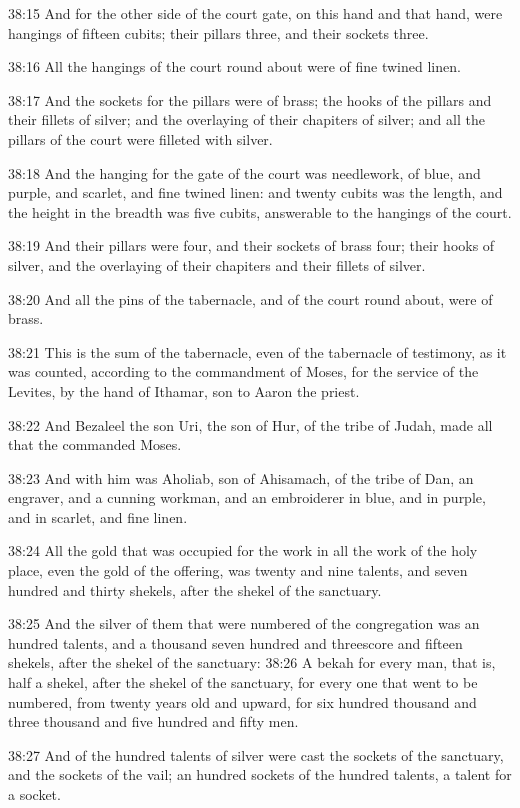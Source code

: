 38:15 And for the other side of the court gate, on this hand and that hand, were hangings of fifteen cubits; their pillars three, and their sockets three.

38:16 All the hangings of the court round about were of fine twined linen.

38:17 And the sockets for the pillars were of brass; the hooks of the pillars and their fillets of silver; and the overlaying of their chapiters of silver; and all the pillars of the court were filleted with silver.

38:18 And the hanging for the gate of the court was needlework, of blue, and purple, and scarlet, and fine twined linen: and twenty cubits was the length, and the height in the breadth was five cubits, answerable to the hangings of the court.

38:19 And their pillars were four, and their sockets of brass four; their hooks of silver, and the overlaying of their chapiters and their fillets of silver.

38:20 And all the pins of the tabernacle, and of the court round about, were of brass.

38:21 This is the sum of the tabernacle, even of the tabernacle of testimony, as it was counted, according to the commandment of Moses, for the service of the Levites, by the hand of Ithamar, son to Aaron the priest.

38:22 And Bezaleel the son Uri, the son of Hur, of the tribe of Judah, made all that the \LORD commanded Moses.

38:23 And with him was Aholiab, son of Ahisamach, of the tribe of Dan, an engraver, and a cunning workman, and an embroiderer in blue, and in purple, and in scarlet, and fine linen.

38:24 All the gold that was occupied for the work in all the work of the holy place, even the gold of the offering, was twenty and nine talents, and seven hundred and thirty shekels, after the shekel of the sanctuary.

38:25 And the silver of them that were numbered of the congregation was an hundred talents, and a thousand seven hundred and threescore and fifteen shekels, after the shekel of the sanctuary: 38:26 A bekah for every man, that is, half a shekel, after the shekel of the sanctuary, for every one that went to be numbered, from twenty years old and upward, for six hundred thousand and three thousand and five hundred and fifty men.

38:27 And of the hundred talents of silver were cast the sockets of the sanctuary, and the sockets of the vail; an hundred sockets of the hundred talents, a talent for a socket.

